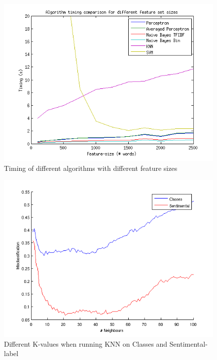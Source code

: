 \begin{figure}[H]
\centering
\includegraphics[scale = 1]{../Plottar/feature_size_TIMING.png}
\caption{Timing of different algorithms with different feature sizes}
\end{figure} 

\begin{figure}[H]
\centering
\includegraphics[scale = 1]{../Plottar/knn_2000words_testdata100_unigram.png}
\caption{Different K-values when running KNN on Classes and Sentimental-label}
\end{figure} 


